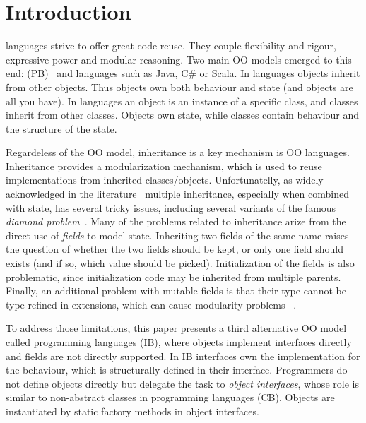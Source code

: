 \section{Introduction}\label{sec:intro}

\Objectoriented languages strive to offer great code reuse.
They couple flexibility and rigour, expressive power and
modular reasoning.  Two main OO models emerged to this end:
\prototypebased (PB)~\cite{Ungar87self} and \classbased languages such as
Java, C\# or Scala.  In \prototypebased
languages objects inherit from other objects. Thus objects own
both behaviour and state (and objects are all you have).
In \classbased languages an object is an instance of a specific class,
and classes inherit from other classes.  Objects own state,
while classes contain behaviour and the structure of the state.

Regardeless of the OO model, inheritance is a key mechanism is OO 
languages. Inheritance provides a modularization mechanism, which 
is used to reuse implementations from inherited classes/objects. 
Unfortunatelly, as widely acknowledged in the literature~\cite{scharli03traits,Sak89dis,bracha90mixin,malayeri2009cz}
multiple inheritance, especially when combined with state, has several
tricky issues, including several variants of the famous 
\emph{diamond problem}~\cite{}. Many of the problems related to 
inheritance arize from the direct use of \emph{fields} to model state. 
Inheriting two fields of the same name raises 
the question of whether the two fields should be kept, or only one 
field should exists (and if so, which value should be picked). Initialization 
of the fields is also problematic, since initialization code may be inherited from 
multiple parents. Finally, an additional problem with mutable fields is that their 
type cannot be type-refined in extensions, which can cause modularity problems
~\cite{wadler98expression,eptrivially}.

To address those limitations, this paper presents a third alternative
OO model called \emph{\interfacebased} \objectoriented programming
languages (IB), where objects implement interfaces directly and fields
are not directly supported. In IB interfaces own the implementation for the
behaviour, which is structurally defined in their
interface. Programmers do not define objects directly but delegate the
task to \emph{object interfaces}, whose role is similar to
non-abstract classes in \classbased \objectoriented programming
languages (CB). Objects are instantiated by static factory methods in
object interfaces.

